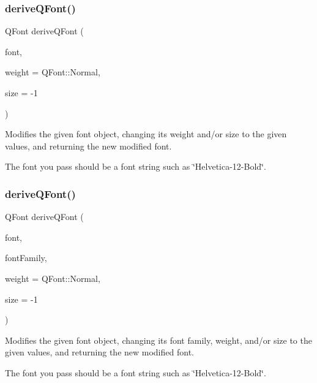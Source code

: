 \subsubsection{\texorpdfstring{derive\+Q\+Font()}{deriveQFont()}\hspace{0.1cm}{\footnotesize\ttfamily [3/4]}}
{\footnotesize\ttfamily Q\+Font derive\+Q\+Font (\begin{DoxyParamCaption}\item[{const std\+::string \&}]{font,  }\item[{Q\+Font\+::\+Weight}]{weight = {\ttfamily QFont\+:\+:Normal},  }\item[{int}]{size = {\ttfamily -\/1} }\end{DoxyParamCaption})\hspace{0.3cm}{\ttfamily [static]}}



Modifies the given font object, changing its weight and/or size to the given values, and returning the new modified font. 

The font you pass should be a font string such as \char`\"{}\+Helvetica-\/12-\/\+Bold\char`\"{}. \mbox{\label{classGFont_a50c41ebc7de0a4a038852b0764d3a6f2}} 
\subsubsection{\texorpdfstring{derive\+Q\+Font()}{deriveQFont()}\hspace{0.1cm}{\footnotesize\ttfamily [4/4]}}
{\footnotesize\ttfamily Q\+Font derive\+Q\+Font (\begin{DoxyParamCaption}\item[{const std\+::string \&}]{font,  }\item[{const std\+::string \&}]{font\+Family,  }\item[{Q\+Font\+::\+Weight}]{weight = {\ttfamily QFont\+:\+:Normal},  }\item[{int}]{size = {\ttfamily -\/1} }\end{DoxyParamCaption})\hspace{0.3cm}{\ttfamily [static]}}



Modifies the given font object, changing its font family, weight, and/or size to the given values, and returning the new modified font. 

The font you pass should be a font string such as \char`\"{}\+Helvetica-\/12-\/\+Bold\char`\"{}. \mbox{\label{classGFont_a3f37291f3e288376754c056a10b64f90}} 

